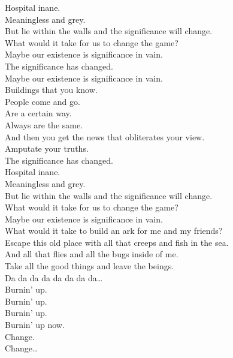 Hospital inane. \\
Meaningless and grey. \\
But lie within the walls and the significance will change. \\
What would it take for us to change the game? \\
Maybe our existence is significance in vain. \\
The significance has changed. \\
Maybe our existence is significance in vain. \\

Buildings that you know. \\
People come and go. \\
Are a certain way. \\
Always are the same. \\
And then you get the news that obliterates your view. \\
Amputate your truths. \\
The significance has changed. \\

Hospital inane. \\
Meaningless and grey. \\
But lie within the walls and the significance will change. \\
What would it take for us to change the game? \\
Maybe our existence is significance in vain. \\

What would it take to build an ark for me and my friends? \\
Escape this old place with all that creeps and fish in the sea. \\
And all that flies and all the bugs inside of me. \\
Take all the good things and leave the  beings. \\

Da da da da da da da da… \\

Burnin' up. \\
Burnin' up. \\
Burnin' up. \\
Burnin' up now. \\

Change. \\
Change… \\


